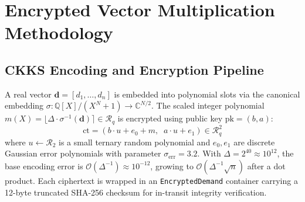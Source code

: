 \documentclass[conference]{IEEEtran}
\begin{document}
\begin{table}[!t]
\centering
\caption{CKKS Cryptographic Parameters ($\geq$128-bit security~\cite{HEStandard2018})}
\label{tab:ckks_params}
\footnotesize
{}
\end{table}

\section{Encrypted Vector Multiplication Methodology}
\label{sec:methodology}

\subsection{CKKS Encoding and Encryption Pipeline}

A real vector $\mathbf{d} = [d_1,\ldots,d_n]$ is embedded into polynomial slots via the canonical embedding $\sigma: \mathbb{Q}[X]/(X^N{+}1) \to \mathbb{C}^{N/2}$. The scaled integer polynomial $m(X) = \lfloor\Delta\cdot\sigma^{-1}(\mathbf{d})\rceil \in \mathcal{R}_q$ is encrypted using public key $\text{pk}=(b,a)$:
\begin{equation}
    \text{ct} = (b\cdot u + e_0 + m,\;\; a\cdot u + e_1) \in \mathcal{R}_q^2
\end{equation}
where $u \leftarrow \mathcal{R}_2$ is a small ternary random polynomial and $e_0,e_1$ are discrete Gaussian error polynomials with parameter $\sigma_\text{err} = 3.2$. With $\Delta=2^{40}\approx10^{12}$, the base encoding error is $\mathcal{O}(\Delta^{-1}) \approx 10^{-12}$, growing to $\mathcal{O}(\Delta^{-1}\sqrt{n})$ after a dot product. Each ciphertext is wrapped in an \texttt{EncryptedDemand} container carrying a 12-byte truncated SHA-256 checksum for in-transit integrity verification.
\end{document}
